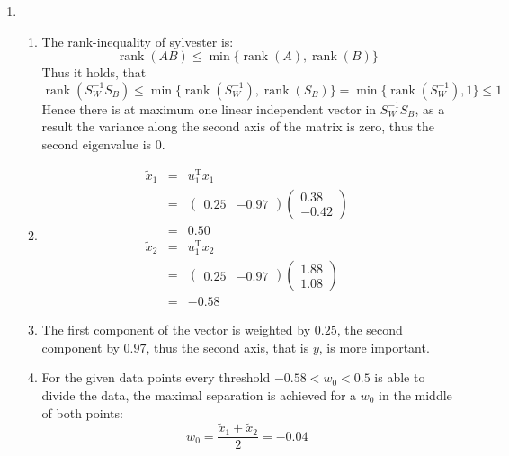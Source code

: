 \documentclass[DIN, pagenumber=false, fontsize=11pt, parskip=half]{scrartcl}
\DeclareMathOperator{\rank}{rank}
\begin{document}
\begin{enumerate}
        \item 
            \begin{enumerate}[label=\alph*)]
                \item
                    The rank-inequality of sylvester is:
                    \begin{equation*}
                        \rank(A B) \leq \min \{ \rank(A), \rank(B) \}
                    \end{equation*}
                    Thus it holds, that
                    \begin{equation*}
                        \rank(S_W^{-1} S_B) \leq \min \{\rank(S_W^{-1}), \rank(S_B)\} 
                            = \min \{\rank(S_W^{-1}), 1\} \leq 1
                    \end{equation*}
                    Hence there is at maximum one linear independent vector in $S_W^{-1} S_B$,
                    as a result the variance along the second axis of the matrix is zero,
                    thus the second eigenvalue is 0.
                \item
                    \begin{eqnarray*}
                        \tilde{x}_1 &=& u_1^\text{T} x_1 \\
                            &=& \begin{pmatrix} 0.25 & -0.97 \end{pmatrix}
                                \begin{pmatrix} 0.38 \\ -0.42 \end{pmatrix} \\
                            &=& 0.50 \\
                        \tilde{x}_2 &=& u_1^\text{T} x_2 \\
                            &=& \begin{pmatrix} 0.25 & -0.97 \end{pmatrix}
                                \begin{pmatrix} 1.88 \\ 1.08 \end{pmatrix} \\
                            &=& -0.58
                    \end{eqnarray*}
                \item The first component of the vector is weighted by $0.25$, the second
                    component by $0.97$, thus the second axis, that is $y$, is more important.
                \item For the given data points every threshold $-0.58 < w_0 < 0.5$
                    is able to divide the data, the maximal separation is achieved
                    for a $w_0$ in the middle of both points:
                    \begin{equation*}
                        w_0 = \frac{\tilde{x}_1 + \tilde{x}_2}{2} = -0.04
                    \end{equation*}
            \end{enumerate}
    \end{enumerate}
\end{document}
